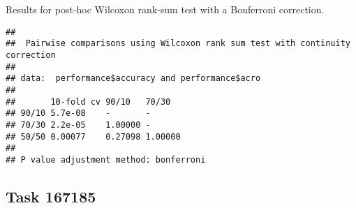 \documentclass[
]{book}
\newenvironment{Shaded}{\begin{snugshade}}{\end{snugshade}}
\newcommand{\AttributeTok}[1]{\textcolor[rgb]{0.13,0.29,0.53}{#1}}
\newcommand{\ConstantTok}[1]{\textcolor[rgb]{0.56,0.35,0.01}{#1}}
\newcommand{\FunctionTok}[1]{\textcolor[rgb]{0.13,0.29,0.53}{\textbf{#1}}}
\newcommand{\NormalTok}[1]{#1}
\newcommand{\SpecialCharTok}[1]{\textcolor[rgb]{0.81,0.36,0.00}{\textbf{#1}}}
\newcommand{\StringTok}[1]{\textcolor[rgb]{0.31,0.60,0.02}{#1}}
\begin{document}
Results for post-hoc Wilcoxon rank-sum test with a Bonferroni correction.

\begin{Shaded}
\end{Shaded}

\begin{verbatim}
## 
##  Pairwise comparisons using Wilcoxon rank sum test with continuity correction 
## 
## data:  performance$accuracy and performance$acro 
## 
##       10-fold cv 90/10   70/30  
## 90/10 5.7e-08    -       -      
## 70/30 2.2e-05    1.00000 -      
## 50/50 0.00077    0.27098 1.00000
## 
## P value adjustment method: bonferroni
\end{verbatim}

\hypertarget{task-167185}{%
\subsection{Task 167185}\label{task-167185}}
\end{document}

